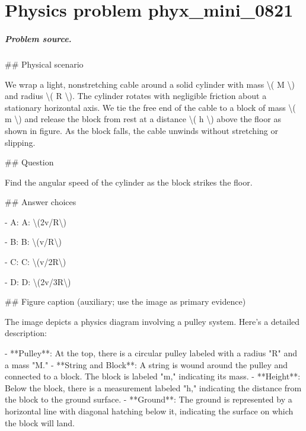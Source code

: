 
\chapter{Physics problem phyx\_mini\_0821}
\label{ch:PhyXMiniProblems_problem_phyx_mini_0821}

\paragraph{Problem source.}
\#\# Physical scenario

We wrap a light, nonstretching cable around a solid cylinder with mass \textbackslash{}( M \textbackslash{}) and radius \textbackslash{}( R \textbackslash{}). The cylinder rotates with negligible friction about a stationary horizontal axis. We tie the free end of the cable to a block of mass \textbackslash{}( m \textbackslash{}) and release the block from rest at a distance \textbackslash{}( h \textbackslash{}) above the floor as shown in figure. As the block falls, the cable unwinds without stretching or slipping.

\#\# Question

Find the angular speed of the cylinder as the block strikes the floor.

\#\# Answer choices

- A: A: \textbackslash{}(2v/R\textbackslash{})

- B: B: \textbackslash{}(v/R\textbackslash{})

- C: C: \textbackslash{}(v/2R\textbackslash{})

- D: D: \textbackslash{}(2v/3R\textbackslash{})

\#\# Figure caption (auxiliary; use the image as primary evidence)

The image depicts a physics diagram involving a pulley system. Here's a detailed description:

- **Pulley**: At the top, there is a circular pulley labeled with a radius "R" and a mass "M."
- **String and Block**: A string is wound around the pulley and connected to a block. The block is labeled "m," indicating its mass.
- **Height**: Below the block, there is a measurement labeled "h," indicating the distance from the block to the ground surface.
- **Ground**: The ground is represented by a horizontal line with diagonal hatching below it, indicating the surface on which the block will land.


